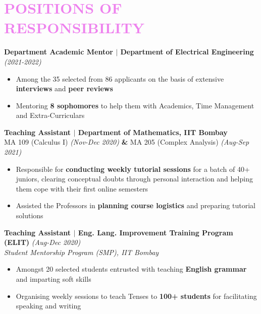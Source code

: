 \documentclass[a4paper,11pt]{article}
\begin{document}
\section{\textcolor{Violet}{\textbf{\Large{P}\large{OSITIONS} \large{OF} \Large{R}\large{ESPONSIBILITY}}}}
\vspace{-5pt}

\textbf{Department Academic Mentor $\mid$ Department of Electrical Engineering} \hfill \emph{(2021-2022)}
\vspace{-7pt} 
\begin{itemize}[noitemsep]
    \item Among the 35 selected from 86 applicants on the basis of extensive \textbf{interviews} and \textbf{peer reviews}
    \item Mentoring \textbf{8 sophomores} to help them with Academics, Time Management and Extra-Curriculars
\end{itemize}
\vspace{-3pt}

\textbf{Teaching Assistant $\mid$ Department of Mathematics, IIT Bombay} \\
MA 109 (Calculus I) \emph{(Nov-Dec 2020)} \textbf{\&} MA 205 (Complex Analysis) \emph{(Aug-Sep 2021)}
\vspace{-7pt} 
\begin{itemize}[noitemsep]
    \item Responsible for \textbf{conducting weekly tutorial sessions} for a batch of 40+ juniors, clearing conceptual doubts through personal interaction and helping them cope with their first online semesters 
    \item Assisted the Professors in \textbf{planning course logistics} and preparing tutorial solutions 
\end{itemize}
\vspace{-3pt}

\textbf{Teaching Assistant $\mid$ Eng. Lang. Improvement Training Program (ELIT)} \hfill \emph{(Aug-Dec 2020)}\\ 
\emph{Student Mentorship Program (SMP), IIT Bombay} 
\vspace{-7pt}
\begin{itemize}[noitemsep]
    \item Amongst 20 selected students entrusted with teaching \textbf{English grammar} and imparting soft skills 
    \item Organising weekly sessions to teach Tenses to \textbf{100+ students} for facilitating speaking and writing
\end{itemize}
\vspace{-5mm}
\end{document}
